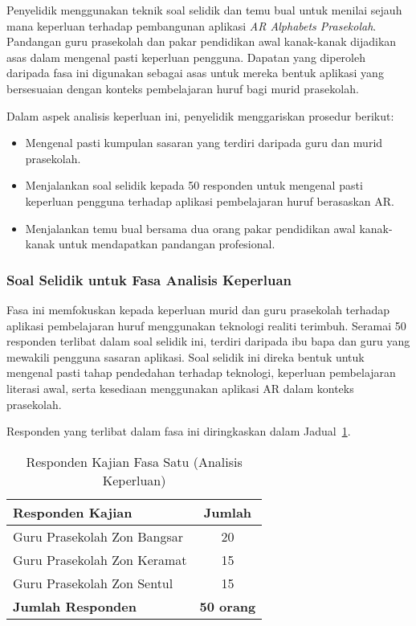 Penyelidik menggunakan teknik soal selidik dan temu bual untuk menilai sejauh mana keperluan terhadap pembangunan aplikasi \textit{AR Alphabets Prasekolah}. Pandangan guru prasekolah dan pakar pendidikan awal kanak-kanak dijadikan asas dalam mengenal pasti keperluan pengguna. Dapatan yang diperoleh daripada fasa ini digunakan sebagai asas untuk mereka bentuk aplikasi yang bersesuaian dengan konteks pembelajaran huruf bagi murid prasekolah.

Dalam aspek analisis keperluan ini, penyelidik menggariskan prosedur berikut:

\begin{itemize}
  \item Mengenal pasti kumpulan sasaran yang terdiri daripada guru dan murid prasekolah.
  \item Menjalankan soal selidik kepada 50 responden untuk mengenal pasti keperluan pengguna terhadap aplikasi pembelajaran huruf berasaskan AR.
  \item Menjalankan temu bual bersama dua orang pakar pendidikan awal kanak-kanak untuk mendapatkan pandangan profesional.
\end{itemize}

\subsubsection{Soal Selidik untuk Fasa Analisis Keperluan}

Fasa ini memfokuskan kepada keperluan murid dan guru prasekolah terhadap aplikasi pembelajaran huruf menggunakan teknologi realiti terimbuh. Seramai 50 responden terlibat dalam soal selidik ini, terdiri daripada ibu bapa dan guru yang mewakili pengguna sasaran aplikasi. Soal selidik ini direka bentuk untuk mengenal pasti tahap pendedahan terhadap teknologi, keperluan pembelajaran literasi awal, serta kesediaan menggunakan aplikasi AR dalam konteks prasekolah.

Responden yang terlibat dalam fasa ini diringkaskan dalam Jadual~\ref{jadual:respondenAnalisis}.
\begin{table}[H]
\centering
\caption{Responden Kajian Fasa Satu (Analisis Keperluan)}
\label{jadual:respondenAnalisis}
\begin{tabular}{|p{6cm}|c|}
\hline
\textbf{Responden Kajian} & \textbf{Jumlah} \\
\hline
Guru Prasekolah Zon Bangsar & 20 \\
\hline
Guru Prasekolah Zon Keramat & 15 \\
\hline
Guru Prasekolah Zon Sentul & 15 \\
\hline
\textbf{Jumlah Responden} & \textbf{50 orang} \\
\hline
\end{tabular}
\end{table}
